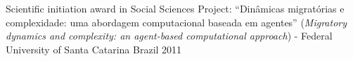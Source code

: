 


\begin{cvhonors}

  \cvhonor
    {Scientific initiation award in Social Sciences} %
    {Project: ``Dinâmicas migratórias e complexidade: uma abordagem computacional baseada em agentes'' (\emph{Migratory dynamics and complexity: an agent-based computational approach}) - Federal University of Santa Catarina} %
    {Brazil} %
    {2011} %
\end{cvhonors}